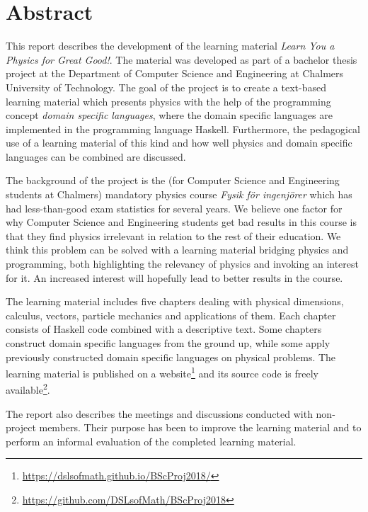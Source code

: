 \setlength{\parskip}{0.5cm}

\thispagestyle{plain}			%
\section*{Abstract}

This report describes the development of the learning material \textit{Learn You
a Physics for Great Good!}. The material was developed as part of a bachelor
thesis project at the Department of Computer Science and Engineering at Chalmers
University of Technology. The goal of the project is to create a text-based
learning material which presents physics with the help of the programming
concept \textit{domain specific languages}, where the domain specific languages
are implemented in the programming language Haskell. Furthermore, the
pedagogical use of a learning material of this kind and how well physics and
domain specific languages can be combined are discussed.

The background of the project is the (for Computer Science and Engineering
students at Chalmers) mandatory physics course \textit{Fysik för ingenjörer}
which has had less-than-good exam statistics for several years. We believe one
factor for why Computer Science and Engineering students get bad results in this
course is that they find physics irrelevant in relation to the rest of their
education. We think this problem can be solved with a learning material bridging
physics and programming, both highlighting the relevancy of physics and invoking
an interest for it. An increased interest will hopefully lead to better
results in the course.

The learning material includes five chapters dealing with physical dimensions,
calculus, vectors, particle mechanics and applications of them. Each chapter
consists of Haskell code combined with a descriptive text. Some chapters
construct domain specific languages from the ground up, while some apply
previously constructed domain specific languages on physical problems. The
learning material is published on a
website\footnote{\url{https://dslsofmath.github.io/BScProj2018/}} and its source
code is freely
available\footnote{\url{https://github.com/DSLsofMath/BScProj2018}}.

The report also describes the meetings and discussions conducted with
non-project members. Their purpose has been to improve the learning material
and to perform an informal evaluation of the completed learning material.


